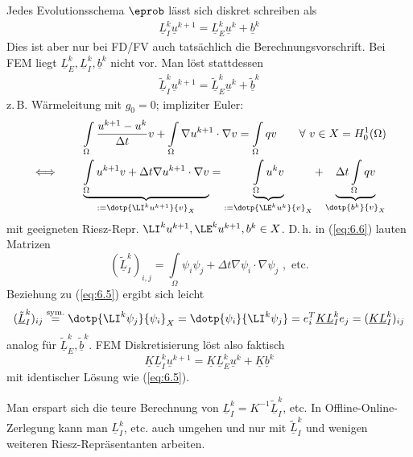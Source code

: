 \begin{bem} 
Jedes Evolutionsschema $\eprob$ lässt sich diskret schreiben als
	\begin{align}\label{eq:6.5}
	\underline{L}_I^k \underline{u}^{k+1} = \underline{L}_E^k \underline{u}^k + \underline{b}^k
	\end{align}
	Dies ist aber nur bei FD/FV auch tatsächlich die Berechnungsvorschrift. Bei FEM liegt $\underline{L}_E^k, \underline{L}_I^k, \underline{b}^k$ nicht vor. Man löst stattdessen
	\begin{align} \label{eq:6.6}
	\underline{\tilde{L}}_I^k \underline{u}^{k+1} = \underline{\tilde{L}}_E^k \underline{u}^k + \underline{\tilde{b}}^k
	\end{align}
	z.\,B. Wärmeleitung mit $g_0 = 0$; impliziter Euler:
	\begin{align*}
	&\int\limits_{\Omega} \frac{u^{k+1}- u^k}{\Delta t} v + \int\limits_{\Omega} \nabla u^{k+1} \cdot \nabla v = \int\limits_{\Omega} q v \qquad \forall \,\, v \in X = H_0^1(\Omega) \\
		\iff \qquad &\underbrace{\int\limits_{\Omega} u^{k+1} v + \Delta t \nabla u^{k+1} \cdot \nabla v}_{:= \dotp{\LI^k u^{k+1}}{v}_X} = \underbrace{\int\limits_{\Omega} u^k v}_{:= \dotp{\LE^k u^k}{v}_X} + \underbrace{\Delta t \int\limits_{\Omega} q v}_{\dotp{b^k}{v}_X}
	\end{align*}
	mit geeigneten Riesz-Repr. $\LI^k u^{k+1}, \LE^k u^{k+1}, b^k \in X$.
	D.\,h. in (\ref{eq:6.6}) lauten Matrizen
	\[
		(\underline{\tilde{L}}_I^k)_{i,j} = \int\limits_{\Omega} \psi_i \psi_j + \Delta t \nabla \psi_i \cdot \nabla \psi_j \,\, , \text{ etc.}
	\]
	Beziehung zu (\ref{eq:6.5}) ergibt sich leicht
	\[
	(\underline{\tilde{L}}_I^k)_{ij} \overset{\text{sym.}}{=} \dotp{\LI^k \psi_j}{\psi_i}_X = \dotp{\psi_i}{\LI^k \psi_j} = e_i^T \underline{K} \underline{L}_I^k e_j = (\underline{K} \underline{L}_I^k)_{ij}
	\]
	analog für $\underline{\tilde{L}}_E^k, \underline{\tilde{b}}^k$. FEM Diskretisierung löst also faktisch
	\[
		\underline{K} \underline{L}_I^k \underline{u}^{k+1} = \underline{K} \underline{L}_E^k \underline{u}^k + \underline{K} \underline{b}^k
	\]
	mit identischer Lösung wie (\ref{eq:6.5}).
	
	Man erspart sich die teure Berechnung von $\underline{L}_I^k = K^{-1} \underline{\tilde{L}}_I^k$, etc. In Offline-Online-Zerlegung kann man $\underline{L}_I^k$, etc. auch umgehen und nur mit $\underline{\tilde{L}}_I^k$ und wenigen weiteren Riesz-Repräsentanten arbeiten.
\end{bem}

